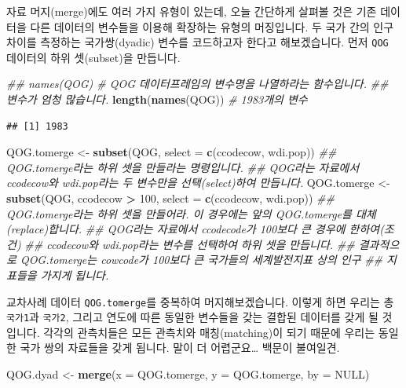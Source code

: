 \documentclass[]{book}
\newenvironment{Shaded}{\begin{snugshade}}{\end{snugshade}}
\newcommand{\CommentTok}[1]{\textcolor[rgb]{0.56,0.35,0.01}{\textit{#1}}}
\newcommand{\DataTypeTok}[1]{\textcolor[rgb]{0.13,0.29,0.53}{#1}}
\newcommand{\DecValTok}[1]{\textcolor[rgb]{0.00,0.00,0.81}{#1}}
\newcommand{\KeywordTok}[1]{\textcolor[rgb]{0.13,0.29,0.53}{\textbf{#1}}}
\newcommand{\NormalTok}[1]{#1}
\newcommand{\OperatorTok}[1]{\textcolor[rgb]{0.81,0.36,0.00}{\textbf{#1}}}
\newcommand{\OtherTok}[1]{\textcolor[rgb]{0.56,0.35,0.01}{#1}}
\newcommand{\StringTok}[1]{\textcolor[rgb]{0.31,0.60,0.02}{#1}}
\begin{document}
자료 머지(merge)에도 여러 가지 유형이 있는데, 오늘 간단하게 살펴볼 것은 기존 데이터을 다른 데이터의 변수들을 이용해 확장하는 유형의 머징입니다. 두 국가 간의 인구 차이를 측정하는 국가쌍(dyadic) 변수를 코드하고자 한다고 해보겠습니다. 먼저 \texttt{QOG} 데이터의 하위 셋(subset)을 만듭니다.

\begin{Shaded}
\begin{Highlighting}[]
\CommentTok{## names(QOG) # QOG 데이터프레임의 변수명을 나열하라는 함수입니다.}
\CommentTok{## 변수가 엄청 많습니다.}
\KeywordTok{length}\NormalTok{(}\KeywordTok{names}\NormalTok{(QOG)) }\CommentTok{# 1983개의 변수}
\end{Highlighting}
\end{Shaded}

\begin{verbatim}
## [1] 1983
\end{verbatim}

\begin{Shaded}
\begin{Highlighting}[]
\NormalTok{QOG.tomerge <-}\StringTok{ }\KeywordTok{subset}\NormalTok{(QOG, }\DataTypeTok{select =} \KeywordTok{c}\NormalTok{(ccodecow, wdi.pop))}
\CommentTok{## QOG.tomerge라는 하위 셋을 만들라는 명령입니다.}
\CommentTok{## QOG라는 자료에서 ccodecow와 wdi.pop라는 두 변수만을 선택(select)하여 만듭니다.}
\NormalTok{QOG.tomerge <-}\StringTok{ }\KeywordTok{subset}\NormalTok{(QOG, ccodecow }\OperatorTok{>}\StringTok{ }\DecValTok{100}\NormalTok{, }\DataTypeTok{select =} \KeywordTok{c}\NormalTok{(ccodecow, wdi.pop))}
\CommentTok{## QOG.tomerge라는 하위 셋을 만들어라. 이 경우에는 앞의 QOG.tomerge를 대체(replace)합니다.}
\CommentTok{## QOG라는 자료에서 ccodecode가 100보다 큰 경우에 한하여(조건)}
\CommentTok{## ccodecow와 wdi.pop라는 변수를 선택하여 하위 셋을 만듭니다.}
\CommentTok{## 결과적으로 QOG.tomerge는 cowcode가 100보다 큰 국가들의 세계발전지표 상의 인구}
\CommentTok{## 지표들을 가지게 됩니다.}
\end{Highlighting}
\end{Shaded}

교차사례 데이터 \texttt{QOG.tomerge}를 중복하여 머지해보겠습니다. 이렇게 하면 우리는 총 \texttt{국가1}과 \texttt{국가2}, 그리고 연도에 따른 동일한 변수들을 갖는 결합된 데이터를 갖게 될 것입니다. 각각의 관측치들은 모든 관측치와 매칭(matching)이 되기 때문에 우리는 동일한 국가 쌍의 자료들을 갖게 됩니다. 말이 더 어렵군요\ldots{} 백문이 불여일견.

\begin{Shaded}
\begin{Highlighting}[]
\NormalTok{QOG.dyad <-}\StringTok{ }\KeywordTok{merge}\NormalTok{(}\DataTypeTok{x =}\NormalTok{ QOG.tomerge, }\DataTypeTok{y =}\NormalTok{ QOG.tomerge, }\DataTypeTok{by =} \OtherTok{NULL}\NormalTok{)}
\end{Highlighting}
\end{Shaded}
\end{document}
